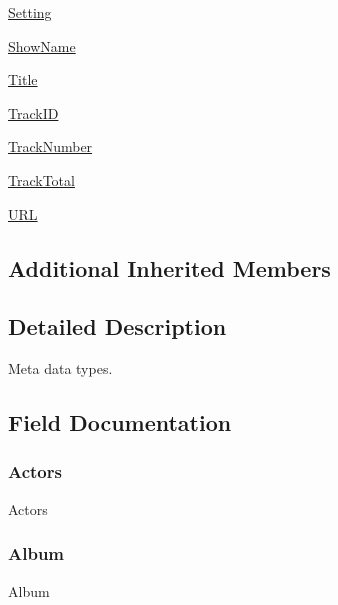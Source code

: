 \begin{DoxyCompactItemize}
\hyperlink{classvlc_1_1_meta_a9c7143555214cb84d55c75a40c0c3539}{Setting}
\item 
\hyperlink{classvlc_1_1_meta_abd33d4fcd5551ed19b49f1e5125f49ac}{Show\+Name}
\item 
\hyperlink{classvlc_1_1_meta_a3b8a7aa6da5e0179967ed8a05804245f}{Title}
\item 
\hyperlink{classvlc_1_1_meta_aaba7463e1421d7f5abfd4318a0174b0d}{Track\+ID}
\item 
\hyperlink{classvlc_1_1_meta_abcc35231c6d54fa7eb023d45b152778c}{Track\+Number}
\item 
\hyperlink{classvlc_1_1_meta_ab96e6c4d893fa6012364abf2fe246a45}{Track\+Total}
\item 
\hyperlink{classvlc_1_1_meta_a137e9820b1471188f4c68eba640db272}{U\+RL}
\end{DoxyCompactItemize}
\subsection*{Additional Inherited Members}


\subsection{Detailed Description}
\begin{DoxyVerb}Meta data types.
\end{DoxyVerb}
 

\subsection{Field Documentation}
\mbox{\label{classvlc_1_1_meta_a736ce93fb9c362d4d5bdf6ab0a2e5b4a}} 
\subsubsection{\texorpdfstring{Actors}{Actors}}
{\footnotesize\ttfamily Actors\hspace{0.3cm}{\ttfamily [static]}}

\mbox{\label{classvlc_1_1_meta_a270aeb5959ead37114825558974ced1a}} 
\subsubsection{\texorpdfstring{Album}{Album}}
{\footnotesize\ttfamily Album\hspace{0.3cm}{\ttfamily [static]}}

